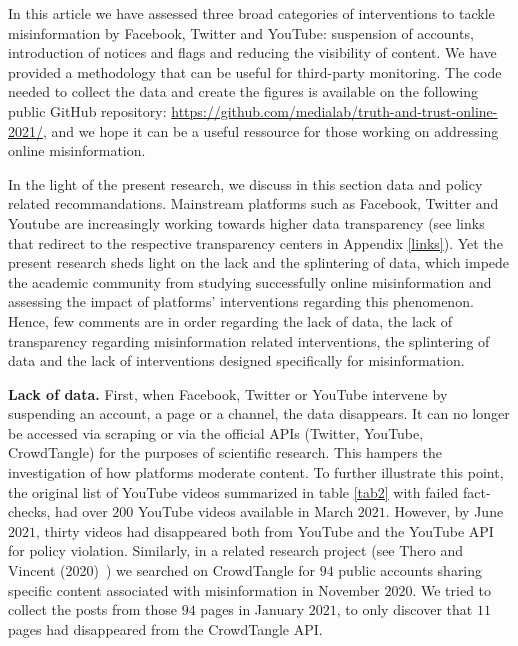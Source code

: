 \documentclass{article}
\begin{document}
In this article we have assessed three broad categories of interventions to tackle misinformation by Facebook, Twitter and YouTube: suspension of accounts, introduction of notices and flags and reducing the visibility of content. We have provided a methodology that can be useful for third-party monitoring. The code needed to collect the data and create the figures is available on the following public GitHub repository: \href{https://github.com/medialab/truth-and-trust-online-2021/}{https://github.com/medialab/truth-and-trust-online-2021/}, and we hope it can be a useful ressource for those working on addressing online misinformation. 


\smallskip


In the light of the present research, we discuss in this section data and policy related recommandations. Mainstream platforms such as Facebook, Twitter and Youtube are increasingly working towards higher data transparency (see links that redirect to the respective transparency centers in Appendix \ref{links}). Yet the present research sheds light on the lack and the splintering of data, which impede the academic community from studying successfully online misinformation and assessing the impact of platforms' interventions regarding this phenomenon. Hence, few comments are in order regarding the lack of data, the lack of transparency regarding misinformation related interventions, the splintering of data and the lack of interventions designed specifically for misinformation. 

\smallskip

{\bf Lack of data.} First, when Facebook, Twitter or YouTube intervene by suspending an account, a page or a channel, the data disappears. It can no longer be accessed via scraping or via the official APIs (Twitter, YouTube, CrowdTangle) for the purposes of scientific research. This hampers the investigation of how platforms moderate content. To further illustrate this point, the original list of YouTube videos summarized in table \ref{tab2} with failed fact-checks, had over $200$ YouTube videos available in March $2021$. However, by June $2021$, thirty videos had disappeared both from YouTube and the YouTube API for policy violation. Similarly, in a related research project (see Thero and Vincent (2020)~\cite{therovincent}) we searched on CrowdTangle for $94$ public accounts sharing specific content associated with misinformation in November $2020$. We tried to collect the posts from those $94$ pages in January $2021$, to only discover that $11$ pages had disappeared from the CrowdTangle API.  
\end{document}

